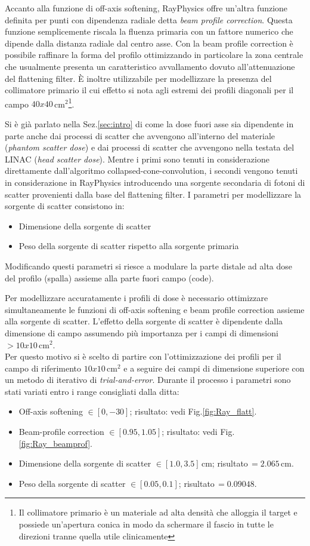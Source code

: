 Accanto alla funzione di off-axis softening, RayPhysics offre un'altra funzione definita per punti con dipendenza radiale detta \textit{beam profile correction}. Questa funzione semplicemente riscala la fluenza primaria con un fattore numerico che dipende dalla distanza radiale dal centro asse. Con la beam profile correction è possibile raffinare la forma del profilo ottimizzando in particolare la zona centrale che usualmente presenta un caratteristico avvallamento dovuto all'attenuazione del flattening filter. \`E inoltre utilizzabile per modellizzare la presenza del collimatore primario il cui effetto si nota agli estremi dei profili diagonali per il campo $40x40\,$cm$^2$\footnote{Il collimatore primario è un materiale ad alta densità che alloggia il target e possiede un'apertura conica in modo da schermare il fascio in tutte le direzioni tranne quella utile clinicamente}.

Si è già parlato nella Sez.\ref{sec:intro} di come la dose fuori asse sia dipendente in parte anche dai processi di scatter che avvengono all'interno del materiale (\textit{phantom scatter dose}) e dai processi di scatter che avvengono nella testata del LINAC (\textit{head scatter dose}). Mentre i primi sono tenuti in considerazione direttamente dall'algoritmo collapsed-cone-convolution, i secondi vengono tenuti in considerazione in RayPhysics introducendo una sorgente secondaria di fotoni di scatter provenienti dalla base del flattening filter. I parametri per modellizzare la sorgente di scatter consistono in:
\begin{itemize}
\item Dimensione della sorgente di scatter
\item Peso della sorgente di scatter rispetto alla sorgente primaria
\end{itemize}
Modificando questi parametri si riesce a modulare la parte distale ad alta dose del profilo (spalla) assieme alla parte fuori campo (code).

Per modellizzare accuratamente i profili di dose è necessario ottimizzare simultaneamente le funzioni di off-axis softening e beam profile correction assieme alla sorgente di scatter. L'effetto della sorgente di scatter è dipendente dalla dimensione di campo assumendo più importanza per i campi di dimensioni $> 10x10\,$cm$^2$.\\
Per questo motivo si è scelto di partire con l'ottimizzazione dei profili per il campo di riferimento $10x10\,$cm$^2$ e a seguire dei campi di dimensione superiore con un metodo di iterativo di \textit{trial-and-error}. Durante il processo i parametri sono stati variati entro i range consigliati dalla ditta:
\begin{itemize}
\item Off-axis softening $\in[0,-30]$; risultato: vedi Fig.\ref{fig:Ray_flatt}.
\item Beam-profile correction $\in[0.95,1.05]$; risultato: vedi Fig.\ref{fig:Ray_beamprof}.
\item Dimensione della sorgente di scatter $\in[1.0,3.5]\,$cm; risultato$\,=2.065\,$cm.
\item Peso della sorgente di scatter $\in[0.05,0.1]$; risultato$\,=0.09048$.
\end{itemize}

